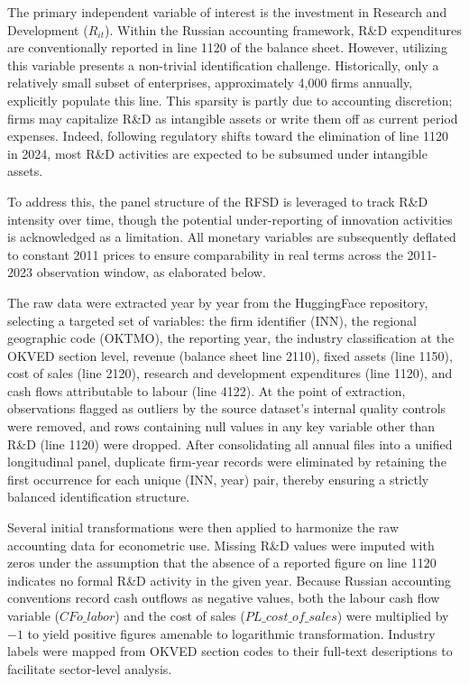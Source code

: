 \documentclass[a4paper, 12pt]{article}
\begin{document}
The primary independent variable of interest is the investment in Research and Development ($R_{it}$). Within the Russian accounting framework, R\&D expenditures are conventionally reported in line 1120 of the balance sheet. However, utilizing this variable presents a non-trivial identification challenge. Historically, only a relatively small subset of enterprises, approximately 4,000 firms annually, explicitly populate this line. This sparsity is partly due to accounting discretion; firms may capitalize R\&D as intangible assets or write them off as current period expenses. Indeed, following regulatory shifts toward the elimination of line 1120 in 2024, most R\&D activities are expected to be subsumed under intangible assets.

To address this, the panel structure of the RFSD \parencite{bondarkov2025russian} is leveraged to track R\&D intensity over time, though the potential under-reporting of innovation activities is acknowledged as a limitation. All monetary variables are subsequently deflated to constant 2011 prices to ensure comparability in real terms across the 2011-2023 observation window, as elaborated below.

The raw data were extracted year by year from the HuggingFace repository, selecting a targeted set of variables: the firm identifier (INN), the regional geographic code (OKTMO), the reporting year, the industry classification at the OKVED section level, revenue (balance sheet line 2110), fixed assets (line 1150), cost of sales (line 2120), research and development expenditures (line 1120), and cash flows attributable to labour (line 4122). At the point of extraction, observations flagged as outliers by the source dataset's internal quality controls were removed, and rows containing null values in any key variable other than R\&D (line 1120) were dropped. After consolidating all annual files into a unified longitudinal panel, duplicate firm-year records were eliminated by retaining the first occurrence for each unique (INN, year) pair, thereby ensuring a strictly balanced identification structure.

Several initial transformations were then applied to harmonize the raw accounting data for econometric use. Missing R\&D values were imputed with zeros under the assumption that the absence of a reported figure on line 1120 indicates no formal R\&D activity in the given year. Because Russian accounting conventions record cash outflows as negative values, both the labour cash flow variable ($CFo\_labor$) and the cost of sales ($PL\_cost\_of\_sales$) were multiplied by $-1$ to yield positive figures amenable to logarithmic transformation. Industry labels were mapped from OKVED section codes to their full-text descriptions to facilitate sector-level analysis.
\end{document}
